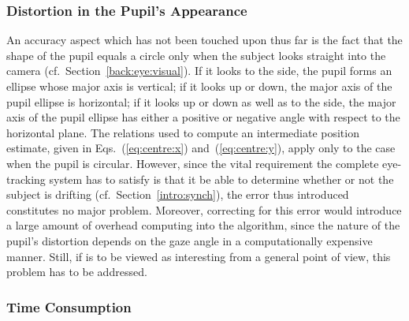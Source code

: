 
\subsubsection{Distortion in the Pupil's Appearance}

An accuracy aspect which has not been touched upon thus far is the
fact that the shape of the pupil equals a circle only when the subject
looks straight into the camera (cf.\ Section~\ref{back:eye:visual}).
If it looks to the side, the pupil forms an ellipse whose major axis
is vertical; if it looks up or down, the major axis of the pupil
ellipse is horizontal; if it looks up or down as well as to the side,
the major axis of the pupil ellipse has either a positive or negative
angle with respect to the horizontal plane.  The relations used to
compute an intermediate position estimate, given in
Eqs.~(\ref{eq:centre:x}) and~(\ref{eq:centre:y}), apply only to the
case when the pupil is circular.  However, since the vital requirement
the complete eye-tracking system has to satisfy is that it be able to
determine whether or not the subject is drifting (cf.\ 
Section~\ref{intro:synch}), the error thus introduced constitutes no
major problem.  Moreover, correcting for this error would introduce a
large amount of overhead computing into the algorithm, since the
nature of the pupil's distortion depends on the gaze angle in a
computationally expensive manner.  Still, if {\octopus} is to be
viewed as interesting from a general point of view, this problem has
to be addressed.

\subsubsection{Time Consumption}

